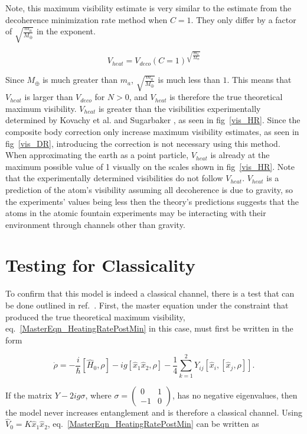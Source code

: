 \documentclass[aps, prd, superscriptaddress,twocolumn,amsmath,amssymb,nofootinbib]{revtex4-1}
\newcommand{\beq}{\begin{equation}}
\newcommand{\eeq}{\end{equation}}
\newcommand{\h}[1]{\hat#1{}}
\begin{document}
Note, this maximum visibility estimate is very similar to the estimate from the decoherence minimization rate method when $C = 1$. They only differ by a factor of $\sqrt{\frac{m_a}{M_\oplus}}$ in the exponent.

 \beq
 V_{heat} = V_{deco}(C=1)^{\sqrt{\frac{m_a}{M_\oplus}}}
 \eeq

Since $M_\oplus$ is much greater than $m_a$, $\sqrt{\frac{m_a}{M_\oplus}}$ is much less than $1$. This means that $V_{heat}$ is larger than $V_{deco}$ for $N>0$, and $V_{heat}$ is therefore the true theoretical maximum visibility. $V_{heat}$ is greater than the visibilities experimentally determined by Kovachy et al. and Sugarbaker \cite{kovachy, sugarbaker}, as seen in fig~\ref{vis_HR}. Since the composite body correction only increase maximum visibility estimates, as seen in fig~\ref{vis_DR}, introducing the correction is not necessary using this method. When approximating the earth as a point particle, $V_{heat}$ is already at the maximum possible value of 1 visually on the scales shown in fig~\ref{vis_HR}. Note that the experimentally determined visibilities do not follow $V_{heat}$. $V_{heat}$ is a prediction of the atom's visibility assuming all decoherence is due to gravity, so the experiments' values being less then the theory's predictions suggests that the atoms in the atomic fountain experiments may be interacting with their environment through channels other than gravity.


\section{Testing for Classicality}

To confirm that this model is indeed a classical channel, there is a test that can be done outlined in ref.~\cite{KTM2}. First, the master equation under the constraint that produced the true theoretical maximum visibility, eq.~\eqref{MasterEqn_HeatingRatePostMin} in this case, must first be written in the form

\beq
 \dot{\rho} = -\frac{i}{\hbar}[\h H_0, \rho] 
 - ig[\h x_1 \h x_2, \rho]
 -\frac{1}{4}\sum_{k=1}^2Y_{ij}[\h x_i, [\h x_j,\rho]].
 \label{MasterEqn_EigenvalueGenForm}
 \eeq
 
If the matrix $Y-2ig\sigma$, where $\sigma = \begin{pmatrix} 
0 & 1 \\
-1 & 0 
\end{pmatrix}$, has no negative eigenvalues, then the model never increases entanglement and is therefore a classical channel. Using $\h V_0 = K\h x_1\h x_2$, eq.~\eqref{MasterEqn_HeatingRatePostMin} can be written as
\end{document}
